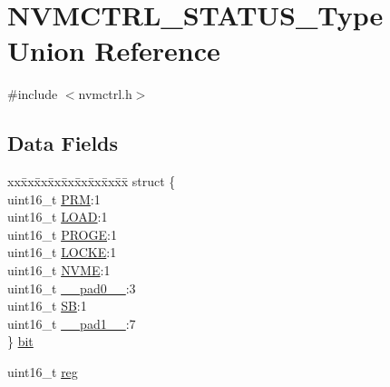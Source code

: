 \hypertarget{union_n_v_m_c_t_r_l___s_t_a_t_u_s___type}{}\section{N\+V\+M\+C\+T\+R\+L\+\_\+\+S\+T\+A\+T\+U\+S\+\_\+\+Type Union Reference}
\label{union_n_v_m_c_t_r_l___s_t_a_t_u_s___type}


{\ttfamily \#include $<$nvmctrl.\+h$>$}

\subsection*{Data Fields}
\begin{DoxyCompactItemize}
\item 
\begin{tabbing}
xx\=xx\=xx\=xx\=xx\=xx\=xx\=xx\=xx\=\kill
struct \{\\
\>uint16\_t \mbox{\hyperlink{union_n_v_m_c_t_r_l___s_t_a_t_u_s___type_aff79f3454d775a44d83b8e602643201d}{PRM}}:1\\
\>uint16\_t \mbox{\hyperlink{union_n_v_m_c_t_r_l___s_t_a_t_u_s___type_a23db1ec7c6b73f3a75dfcbc553ec1a8b}{LOAD}}:1\\
\>uint16\_t \mbox{\hyperlink{union_n_v_m_c_t_r_l___s_t_a_t_u_s___type_a78419bea92237d2fb91c4abe2aa1bb5d}{PROGE}}:1\\
\>uint16\_t \mbox{\hyperlink{union_n_v_m_c_t_r_l___s_t_a_t_u_s___type_a6ac149611ed92fbb86c2c515f0d9c175}{LOCKE}}:1\\
\>uint16\_t \mbox{\hyperlink{union_n_v_m_c_t_r_l___s_t_a_t_u_s___type_a58b4cfc99058405b6681c69838238820}{NVME}}:1\\
\>uint16\_t \mbox{\hyperlink{union_n_v_m_c_t_r_l___s_t_a_t_u_s___type_a77132c2c26a75f5b8751b235cda23828}{\_\_pad0\_\_}}:3\\
\>uint16\_t \mbox{\hyperlink{union_n_v_m_c_t_r_l___s_t_a_t_u_s___type_ac17f518cfb257b6a7cef03bb3ad53eff}{SB}}:1\\
\>uint16\_t \mbox{\hyperlink{union_n_v_m_c_t_r_l___s_t_a_t_u_s___type_ab72e3a1f2f7db8695c60c658f5a0f11a}{\_\_pad1\_\_}}:7\\
\} \mbox{\hyperlink{union_n_v_m_c_t_r_l___s_t_a_t_u_s___type_a2bdf45e007cea863ebda30a066201e83}{bit}}\\

\end{tabbing}\item 
uint16\+\_\+t \mbox{\hyperlink{union_n_v_m_c_t_r_l___s_t_a_t_u_s___type_a11760f5020019f4aa8cb02e694f7cc44}{reg}}
\end{DoxyCompactItemize}



